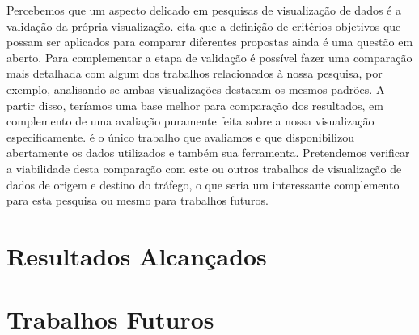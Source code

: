  Percebemos que um aspecto delicado em pesquisas de visualização de dados é a
validação da própria visualização. \citet{Telea2018} cita que a definição de
critérios objetivos que possam ser aplicados para comparar diferentes propostas
ainda é uma questão em aberto. Para complementar a etapa de validação é
possível fazer uma comparação mais detalhada com algum dos trabalhos
relacionados à nossa pesquisa, por exemplo, analisando se ambas visualizações
destacam os mesmos padrões. A partir disso, teríamos uma base melhor para
comparação dos resultados, em complemento de uma avaliação puramente feita
sobre a nossa visualização especificamente.  \citet{Guo2011} é o único trabalho
que avaliamos e que disponibilizou abertamente os dados utilizados e também sua
ferramenta.  Pretendemos verificar a viabilidade desta comparação com este ou
outros trabalhos de visualização de dados de origem e destino do tráfego, o que
seria um interessante complemento para esta pesquisa ou mesmo para trabalhos
futuros.


\section{Resultados Alcançados}

\section{Trabalhos Futuros}

